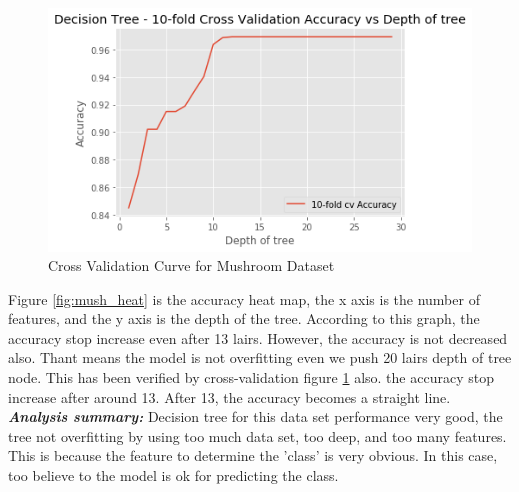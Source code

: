 \documentclass[10pt, conference, compsocconf]{IEEEtran}
\begin{document}
\begin{figure}[h]
	\centering
	\includegraphics[scale = 0.5]{image/DT_MushRoom_crossValidation.png}
	\caption{Cross Validation Curve for Mushroom Dataset }
	\label{fig:mush_cv}
\end{figure}
Figure \ref{fig:mush_heat} is the accuracy heat map, the x axis is the number of features, and the y axis is the depth of the tree. According to this graph, the accuracy stop increase even after 13 lairs. However, the accuracy is not decreased also. Thant means the model is not overfitting even we push 20 lairs depth of tree node. This has been verified by cross-validation figure \ref{fig:mush_cv} also. the accuracy stop increase after around 13. After 13, the accuracy becomes a straight line.\\
\textit{\textbf{Analysis summary:}} Decision tree for this data set performance very good, the tree not overfitting by using too much data set, too deep, and too many features. This is because the feature to determine the 'class' is very obvious. In this case, too believe to the model is ok for predicting the class. 
\end{document}
